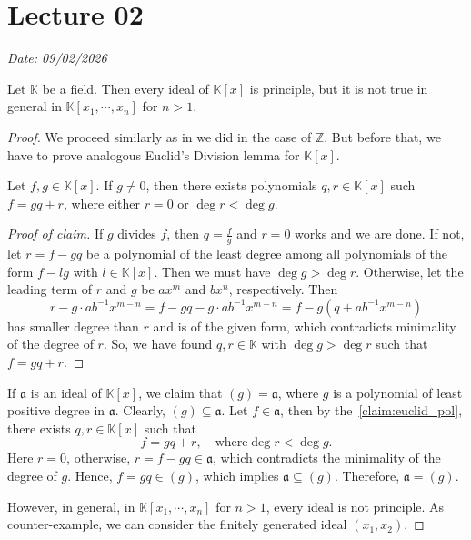 \chapter{Lecture 02}
\hfill {\footnotesize \textit{Date: 09/02/2026}}

\begin{proposition}
    Let \(\mathbb{K}\) be a field. Then every ideal of \(\mathbb{K}[x]\) is principle, but it is not true in general in \(\mathbb{K}[x_1, \cdots, x_n]\) for \(n > 1\).
\end{proposition}
\begin{proof}
    We proceed similarly as in we did in the case of \(\mathbb{Z}\). But before that, we have to prove analogous Euclid's Division lemma for \(\mathbb{K}[x]\).
    \begin{claim}\label{claim:euclid_pol}
    Let \(f, g \in \mathbb{K}[x]\). If \(g \neq 0\), then there exists polynomials \(q, r \in \mathbb{K}[x]\) such \(f = gq + r\), where either \( r = 0 \) or \(\deg r < \deg g\).
\end{claim}

\begin{proof}[Proof of claim]
If \(g\) divides \(f\), then \(q = \frac{f}{g}\) and \( r = 0 \) works and we are done. If not, let \(r = f - gq\) be a polynomial of the least degree among all polynomials of the form \(f- lg\) with \(l \in \mathbb{K}[x]\). Then we must have \(\deg g > \deg r\). Otherwise, let the leading term of \(r\) and \(g\) be \(ax^m\) and \(bx^n\), respectively. Then \[r - g \cdot ab^{-1}x^{m-n} = f - gq - g \cdot ab^{-1}x^{m-n} = f - g(q + ab^{-1}x^{m-n})\] has smaller degree than \(r\) and is of the given form, which contradicts minimality of the degree of \(r\).
So, we have found \( q, r \in \mathbb{K} \) with  \( \operatorname{deg} g > \operatorname{deg} r\) such that  \( f = gq + r \).
\end{proof}

If \(\mathfrak{a}\) is an ideal of \(\mathbb{K}[x]\), we claim that \((g) = \mathfrak{a}\), where \(g\) is a polynomial of least positive degree in \(\mathfrak{a}\). Clearly, \((g) \subseteq \mathfrak{a}\). Let \(f \in \mathfrak{a}\), then by the~\autoref{claim:euclid_pol}, there exists \(q, r \in \mathbb{K}[x]\) such that \[f = gq + r, \quad \text{where} \deg r < \deg g.\] Here \(r = 0\), otherwise, \(r = f - gq \in \mathfrak{a}\), which contradicts the minimality of the degree of \(g\). Hence, \(f = gq \in (g) \), which implies \(\mathfrak{a} \subseteq (g)\). Therefore, \(\mathfrak{a} = (g)\).

However, in general, in \(\mathbb{K}[x_1, \cdots, x_n]\) for \(n > 1\), every ideal is not principle. As counter-example, we can consider the finitely generated ideal \((x_1, x_2)\).
\end{proof}

